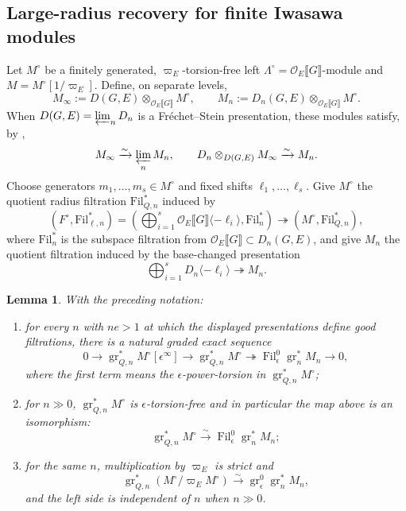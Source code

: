 \documentclass[11pt]{article}
\newtheorem{lemma}[theorem]{Lemma}
\theoremstyle{definition}
\newcommand{\cO}{\mathcal O}
\newcommand{\gr}{\operatorname{gr}}
\newcommand{\Fil}{\operatorname{Fil}}
\begin{document}


\subsection{Large-radius recovery for finite Iwasawa modules}
\label{sec:recovery}

Let $M^\circ$ be a finitely generated, $\varpi_E$-torsion-free left
$\Lambda ^\circ=\cO_E\llbracket G\rrbracket$-module and $M=M^\circ[1/\varpi_E]$.  Define, on separate
levels,
\[
 M_{\infty}
 :=D(G,E)\otimes_{\cO_E\llbracket G\rrbracket}M^\circ,\qquad
 M_n
 :=D_n(G, E)\otimes_{\cO_E\llbracket G\rrbracket}M^\circ.
\]
When $D(G,E)=\varprojlim_nD_n$ is a Fr\'echet--Stein presentation,
these modules satisfy, by \cite[Theorem~A and Corollaries~3.1,~3.4(v)]{ST03},
\[
 M_{\infty}\xrightarrow{\sim}\varprojlim_nM_n,\qquad
 D_n\otimes_{D(G,E)}M_{\infty}\xrightarrow{\sim}M_n.
\]
Choose generators $m_1,\ldots,m_s\in M^\circ$ and fixed shifts
$\ell_1,\ldots,\ell_s$.  Give $M^\circ$ the quotient radius filtration $\mathrm{Fil}_{Q,n}^*$ induced
by
\[
 (F^\circ,\mathrm{Fil}_{\underline{\ell}, n}^*)=(\bigoplus_{i=1}^s
 \cO_E\llbracket G\rrbracket\langle-\ell_i\rangle, \mathrm{Fil}_n^*)
 \twoheadrightarrow (M^\circ, \mathrm{Fil}_{Q, n}^*),
\]
where $\mathrm{Fil}_{n}^*$ is the subspace filtration from $\cO_E\llbracket G\rrbracket\subset D_n(G, E)$,
and give $M_n$ the quotient filtration induced by the
base-changed presentation
\[
 \bigoplus_{i=1}^sD_n\langle-\ell_i\rangle
 \twoheadrightarrow M_n.
\]

\begin{lemma}%
\label{lem:large-radius-recovery}
With the preceding notation:
\begin{enumerate}
 \item for every $n$ with $ne>1$ at which the displayed presentations
       define good filtrations, there is a natural graded
       exact sequence
       \[0\to\gr_{Q,n}^{*}M^\circ[\epsilon^{\infty}]\to
        \gr_{Q,n}^{*}M^\circ\twoheadrightarrow
        \Fil_\epsilon^0\gr_n^{*}M_n\to0,
       \]where the first term means the $\epsilon$-power-torsion in $\gr_{Q,n}^{*}M^\circ$;
 \item for $n\gg0$, $\gr_{Q,n}^{*}M^\circ$ is
       $\epsilon$-torsion-free and in particular the map above is an isomorphism:
       \[
        \gr_{Q,n}^{*}M^\circ
        \xrightarrow{\sim}
        \Fil_\epsilon^0\gr_n^{*}M_n;
       \]
 \item for the same $n$, multiplication by $\varpi_E$ is strict and
       \[
        \gr_{Q,n}^{*}(M^\circ/\varpi_EM^\circ)
        \xrightarrow{\sim}
        \gr_\epsilon^0\gr_n^{*}M_n,
       \]
       and the left side is independent of $n$ when $n\gg0$.
\end{enumerate}
\end{lemma}
\end{document}
